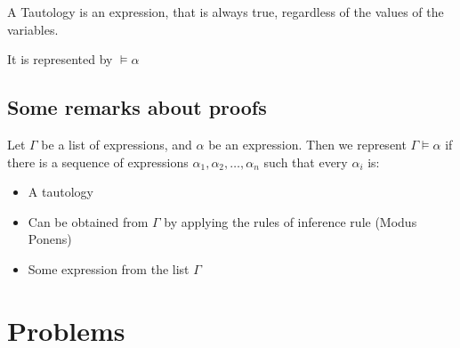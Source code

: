 \documentclass{article}
\begin{document}
A Tautology is an expression, that is always true, regardless of the values of the variables.

It is represented by $\models \alpha$

\subsection*{Some remarks about proofs}

Let $\Gamma$ be a list of expressions, and $\alpha$ be an expression. Then we represent $\Gamma \models \alpha$ if there is a sequence of expressions $\alpha_1, \alpha_2,\dots,\alpha_n$ such that every $\alpha_i$ is:

\begin{itemize}
    \item A tautology
    \item Can be obtained from $\Gamma$ by applying the rules of inference rule (Modus Ponens)
    \item Some expression from the list $\Gamma$
\end{itemize}


\section{Problems}
\end{document}
